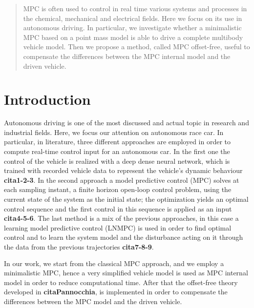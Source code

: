 \documentclass[conference]{IEEEtran} %
\begin{document}

\begin{abstract}
	MPC is often used to control in real time various systems and processes in the 
	chemical, mechanical and electrical fields. Here we focus on its use in autonomous 
	driving. In particular, we investigate whether a minimalistic MPC based on a 
	point mass model is able to drive a complete multibody vehicle model.
	Then we propose a method, called MPC offset-free, useful to compensate
	the differences between the MPC internal model and the driven vehicle.
\end{abstract}

\IEEEpeerreviewmaketitle

\section{Introduction}
Autonomous driving is one of the most discussed and actual topic in research and industrial fields. Here, we focus our attention on autonomous race car. In particular, in literature, three different approaches are employed in order to compute real-time control input for an autonomous car. 
In the first one the control of the vehicle is realized with a deep dense neural network, which is trained with recorded vehicle data to represent the vehicle's dynamic behaviour \textbf{cita{1-2-3}}. In the second approach a model predictive control (MPC) solves at each sampling instant, a finite horizon open-loop control problem, using the current state of the system as the initial state; the optimization yields an optimal control sequence and the first control in this sequence is applied as an input \textbf{cita{4-5-6}}. The last method is a mix of the previous approaches, in this case a learning model predictive control (LNMPC) is used in order to find optimal control and
to learn the system model and the disturbance acting on it through the data from the previous trajectories \textbf{cita{7-8-9}}.  


In our work, we start from the classical MPC approach, and we employ a minimalistic MPC, hence a very simplified vehicle model is used as MPC internal model in order to reduce computational time. 
After that the offset-free theory developed in \textbf{cita{Pannocchia}}, is implemented in order to compensate the differences between the MPC model and the driven vehicle. 
\end{document}
